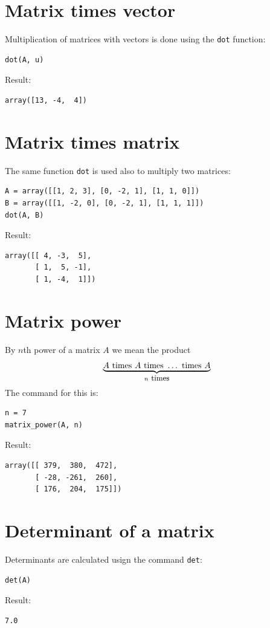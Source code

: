 \documentclass[article,A4,12pt]{llncs}
\begin{document}
\section{Matrix times vector}

Multiplication of matrices with vectors is done using the {\tt dot} function:
\begin{verbatim}
dot(A, u)
\end{verbatim}
Result:
\begin{verbatim}
array([13, -4,  4])
\end{verbatim}

\section{Matrix times matrix}

The same function {\tt dot} is used also to multiply two matrices:
\begin{verbatim}
A = array([[1, 2, 3], [0, -2, 1], [1, 1, 0]])
B = array([[1, -2, 0], [0, -2, 1], [1, 1, 1]])
dot(A, B)
\end{verbatim}
Result:
\begin{verbatim}
array([[ 4, -3,  5],
       [ 1,  5, -1],
       [ 1, -4,  1]])
\end{verbatim}

\section{Matrix power}

By $n$th power of a matrix $A$ we mean the product
$$
\underbrace{A \ \mbox{times}\ A \ \mbox{times} \ \ldots \ \mbox{times} \ A}_{n \ {\small \mbox{times}}}
$$ 
The command for this is:
\begin{verbatim}
n = 7
matrix_power(A, n)
\end{verbatim}
Result:
\begin{verbatim}
array([[ 379,  380,  472],
       [ -28, -261,  260],
       [ 176,  204,  175]])
\end{verbatim}

\section{Determinant of a matrix}

Determinants are calculated usign the command {\tt det}:
\begin{verbatim}
det(A)
\end{verbatim}
Result:
\begin{verbatim}
7.0
\end{verbatim}
\end{document}
